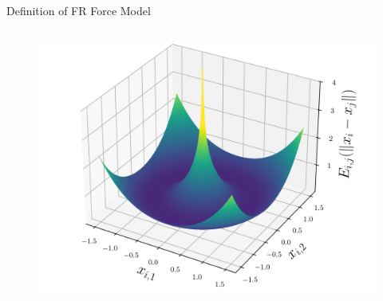 \documentclass[dvipdfmx,13pt,aspectratio=169]{beamer}
\newcommand{\tccA}[1]{\textcolor{cA}{#1}}
\newcommand{\tccD}[1]{\textcolor{cD}{#1}}
\newcommand{\defeq}{\coloneqq}
\newif\ifShowHidden
\begin{document}
\begin{frame}{Definition of FR Force Model}
\begin{columns}
\begin{column}{0.3\columnwidth}
\begin{figure}[h]
        \end{figure}
        \begin{figure}[h]
          \centering
          \includegraphics[width=\columnwidth]{../main/energy_3d/energy_3d.png}
        \end{figure}
      \end{column}
    \end{columns}
  \end{frame}
\fi

\ifShowHidden
  \begin{frame}{Simplify the Problem}
    Graphs have sparsity : $\tccA{\abs{E}} \ll \tccD{\abs{V}^2}$ / the energy function $E_{i,j}$ is $\tccD{-k^2\log{d}}$ for all $\{i,j\} \notin E$.
    \begin{mini}
      {X \in \bbR^{2 \times n}}
      {\sum_{\{i,j\}\in E} \tccA{\frac{w_{i,j}\norm{x_i - x_j}^3}{3k}} - \tccD{\sum_{i<j} k^2\log{\norm{x_i - x_j}}}.}
      {\label{eq:frApprox}}
      {}
    \end{mini}
    Converting the second term into a constraint
    (obj: $\tccA{\order{\abs{E}}}$ terms from $\tccD{\order{\abs{V}^2}}$ terms)
    \begin{mini}
      {X \in \bbR^{2 \times n}}
      {f^{\mathrm{a}}(X) \defeq \tccA{\sum_{\{i,j\}\in E} \frac{w_{i,j}\norm{x_i - x_j}^3}{3k}}}
      {\label{eq:frApprox2}}
      {}
      \addConstraint{\tccD{\norm{x_i - x_j}}}{\tccD{\geq \epsilon},\quad}{\forall \{i,j\}\,(i<j)}
    \end{mini}
    where $\epsilon$ is a suitably chosen positive constant.\\
    This conversion does not lose the essence of the problem too much because $\tccD{E^\mathrm{r}(d)=-k^2\log{d}}$ is monotonically decreasing.
  \end{frame}
\fi
\end{document}
